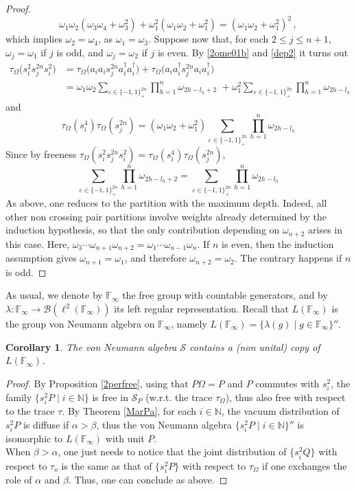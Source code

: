 \documentclass[12pt]{amsart}
\numberwithin{equation}{section}
\def\bn{{\mathbb N}}
\def\a{\alpha}
\def\b{\beta}
\def\eps{\varepsilon}
\def\l{\lambda} \def\L{\Lambda}
\def\t{\tau}
\def\om{\omega} \def\Om{\Omega}
\newtheorem{cor}[thm]{Corollary}
\theoremstyle{definition}
\begin{document}
\begin{proof}
$$
\om_1\om_2(\om_3\om_4+\om_3^2)+\om_1^2(\om_1\om_2+\om_1^2)=(\om_1\om_2+\om_1^2)^2\,,
$$
which implies $\om_2=\om_4$, as $\om_1=\om_3$. Suppose now that, for each $2\leq j\leq n+1$, $\om_j=\om_1$ if $j$ is odd, and $\om_j=\om_{2}$ if $j$ is even. By \eqref{2ome01b} and \eqref{dep2} it turns out
\begin{align*}
\t_\Om\big(s_i^2s_j^{2n}s_i^2\big)&=\t_\Om\big(a_ia_is_j^{2n}a_i^\dag a_i^\dag\big)+\t_\Om\big(a_ia_i^\dag s_j^{2n}a_ia_i^\dag\big)\\
&=\om_1\om_2\sum_{\eps\in\{-1,1\}^{2n}_+}\prod_{h=1}^n \om_{2h-l_h+2}\,\, +\om_1^2\sum_{\eps\in\{-1,1\}^{2n}_+}\prod_{h=1}^n \om_{2h-l_h}
\end{align*}
and
$$
\t_\Om(s_i^4)\t_\Om(s_j^{2n})=(\om_1\om_2+\om_1^2)\sum_{\eps\in\{-1,1\}^{2n}_+}\prod_{h=1}^n \om_{2h-l_h}
$$
Since by freeness $\t_\Om(s_i^2s_j^{2n}s_i^2)=\t_\Om(s_i^4)\t_\Om(s_j^{2n})$,
$$
\sum_{\eps\in\{-1,1\}^{2n}_+}\prod_{h=1}^n \om_{2h-l_h+2}=\sum_{\eps\in\{-1,1\}^{2n}_+}\prod_{h=1}^n \om_{2h-l_h}
$$
As above, one reduces to the partition with the maximum depth. Indeed, all other non crossing pair partitions involve weights already determined by the induction hypothesis, so that the only contribution depending on $\om_{n+2}$ arises in this case. Here, $\om_3\cdots \om_{n+1}\om_{n+2}=\om_1\cdots \om_{n-1}\om_n$. If $n$ is even, then the induction assumption gives $\om_{n+1}=\om_1$, and therefore $\om_{n+2}=\om_2$. The contrary happens if $n$ is odd.
\end{proof}
As usual, we denote by $\mathbb F_\infty$ the free group with countable generators, and by $\l:\mathbb F_\infty\rightarrow \mathcal{B}(\ell^2(\mathbb F_\infty))$ its left regular representation. Recall that $L(\mathbb F_\infty)$ is the group von Neumann algebra on $\mathbb F_\infty$, namely $L(\mathbb F_\infty)=\{\l(g)\mid g\in \mathbb F_\infty\}''$.
\begin{cor}
The von Neumann algebra $\mathcal{S}$ contains a (non unital) copy of $L(\mathbb F_\infty)$. \end{cor}
\begin{proof}
By Proposition \ref{2perfree}, using that $P\Omega=P$ and $P$
commutes with $s_i^2$, the family $\{s_i^2P\mid i\in \mathbb N\}$ is
free in $\mathcal{S}_P$ (w.r.t. the trace $\t_\Om$), thus also free with respect to the trace
$\tau$. By Theorem \ref{MarPa}, for each $i\in\bn$, the vacuum distribution of
  $s_i^2P$ is diffuse if $\a>\b$, thus the von Neumann algebra $\{s_i^2P\mid i\in \mathbb N\}''$ is isomorphic to $L(\mathbb F_\infty)$ \cite{V} with unit $P$.\\
When $\b>\a$, one just needs to notice that the joint distribution of
  $\{s_i^2Q\}$ with respect to $\tau_o$ is the same as that of $\{s_i^2P\}$ with respect to $\tau_\Omega$ if one exchanges the role of $\a$ and $\b$. Thus, one can conclude as above.
\end{proof}
\end{document}
